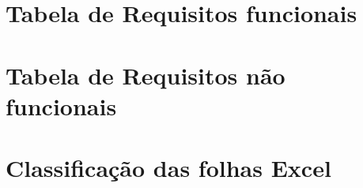 \chapter{Tabela de Requisitos funcionais}
\label{ch:outroDetalheAdicional}


\chapter{Tabela de Requisitos não funcionais}
\label{ch:outroDetalheAdicional}


\chapter{Classificação das folhas Excel}
\label{ch:outroDetalheAdicional}









